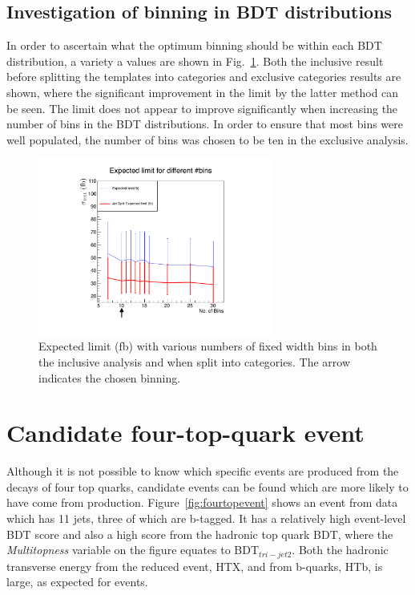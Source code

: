 \subsection{Investigation of binning in BDT distributions \label{appsub:binning}}

In order to ascertain what the optimum binning should be within each BDT distribution, a variety a values are shown in Fig.~\ref{fig:Binning}. Both the inclusive result before splitting the templates into \njets categories and exclusive \njets categories results are shown, where the significant improvement in the limit by the latter method can be seen. The limit does not appear to improve significantly when increasing the number of bins in the BDT distributions. In order to ensure that most bins were well populated, the number of bins was chosen to be ten in the exclusive analysis.

\begin{figure}[ht!]
\centering
    \includegraphics[width=0.69\textwidth]{images/Run1/binning2.pdf}
    \caption{Expected limit (fb) with various numbers of fixed width bins in both the inclusive analysis and when split into \njets categories. The arrow indicates the chosen binning.}
    \label{fig:Binning}
\end{figure}

\section{Candidate four-top-quark event}

Although it is not possible to know which specific events are produced from the decays of four top quarks, candidate events can be found which are more likely to have come from \tttt production. Figure~\ref{fig:fourtopevent} shows an event from data which has 11 jets, three of which are b-tagged. It has a relatively high event-level BDT score and also a high score from the hadronic top quark BDT, where the \emph{Multitopness} variable on the figure equates to BDT$_{tri-jet2}$. Both the hadronic transverse energy from the reduced event, HTX, and from b-quarks, HTb, is large, as expected for \tttt events. 

